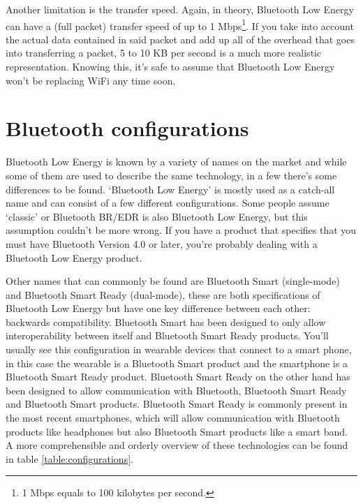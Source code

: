 \documentclass[pdftex,a4paper,12pt,twoside]{report}
\begin{document}
Another limitation is the transfer speed. Again, in theory, Bluetooth Low Energy can have a (full packet) transfer speed of up to 1 Mbps\footnote{1 Mbps equals to 100 kilobytes per second.}. If you take into account the actual data contained in said packet and add up all of the overhead that goes into transferring a packet, 5 to 10 KB per second is a much more realistic representation. Knowing this, it's safe to assume that Bluetooth Low Energy won't be replacing WiFi any time soon.


\section{Bluetooth configurations}
\label{sec:bleconfigurations}
Bluetooth Low Energy is known by a variety of names on the market and while some of them are used to describe the same technology, in a few there's some differences to be found. `Bluetooth Low Energy' is mostly used as a catch-all name and can consist of a few different configurations. Some people assume `classic' or Bluetooth BR/EDR is also Bluetooth Low Energy, but this assumption couldn't be more wrong. If you have a product that specifies that you must have Bluetooth Version 4.0 or later, you're probably dealing with a Bluetooth Low Energy product.

Other names that can commonly be found are Bluetooth Smart (single-mode) and Bluetooth Smart Ready (dual-mode), these are both specifications of Bluetooth Low Energy but have one key difference between each other: backwards compatibility. Bluetooth Smart has been designed to only allow interoperability between itself and Bluetooth Smart Ready products. You'll usually see this configuration in wearable devices that connect to a smart phone, in this case the wearable is a Bluetooth Smart product and the smartphone is a Bluetooth Smart Ready product. Bluetooth Smart Ready on the other hand has been designed to allow communication with Bluetooth, Bluetooth Smart Ready and Bluetooth Smart products. Bluetooth Smart Ready is commonly present in the most recent smartphones, which will allow communication with Bluetooth products like headphones but also Bluetooth Smart products like a smart band. A more comprehensible and orderly overview of these technologies can be found in table \ref{table:configurations}.
\end{document}
